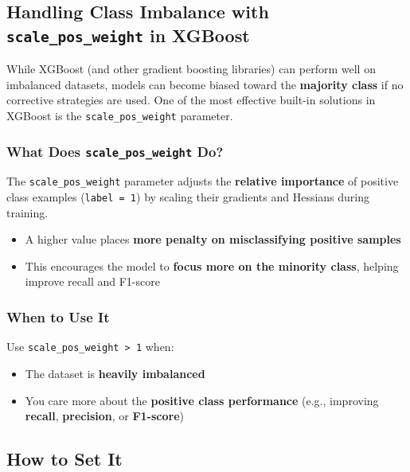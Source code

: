 \documentclass[
  letterpaper,
  DIV=11,
  numbers=noendperiod]{scrreprt}
\providecommand{\tightlist}{%
  \setlength{\itemsep}{0pt}\setlength{\parskip}{0pt}}\usepackage{longtable,booktabs,array}
\begin{document}
\subsection{\texorpdfstring{Handling Class Imbalance with
\texttt{scale\_pos\_weight} in
XGBoost}{Handling Class Imbalance with scale\_pos\_weight in XGBoost}}\label{handling-class-imbalance-with-scale_pos_weight-in-xgboost}

While XGBoost (and other gradient boosting libraries) can perform well
on imbalanced datasets, models can become biased toward the
\textbf{majority class} if no corrective strategies are used. One of the
most effective built-in solutions in XGBoost is the
\texttt{scale\_pos\_weight} parameter.

\subsubsection{\texorpdfstring{What Does \texttt{scale\_pos\_weight}
Do?}{What Does scale\_pos\_weight Do?}}\label{what-does-scale_pos_weight-do}

The \texttt{scale\_pos\_weight} parameter adjusts the \textbf{relative
importance} of positive class examples (\texttt{label\ =\ 1}) by scaling
their gradients and Hessians during training.

\begin{itemize}
\tightlist
\item
  A higher value places \textbf{more penalty on misclassifying positive
  samples}
\item
  This encourages the model to \textbf{focus more on the minority
  class}, helping improve recall and F1-score
\end{itemize}

\subsubsection{When to Use It}\label{when-to-use-it}

Use \texttt{scale\_pos\_weight\ \textgreater{}\ 1} when:

\begin{itemize}
\tightlist
\item
  The dataset is \textbf{heavily imbalanced}
\item
  You care more about the \textbf{positive class performance} (e.g.,
  improving \textbf{recall}, \textbf{precision}, or \textbf{F1-score})
\end{itemize}

\subsection{How to Set It}\label{how-to-set-it}
\end{document}
